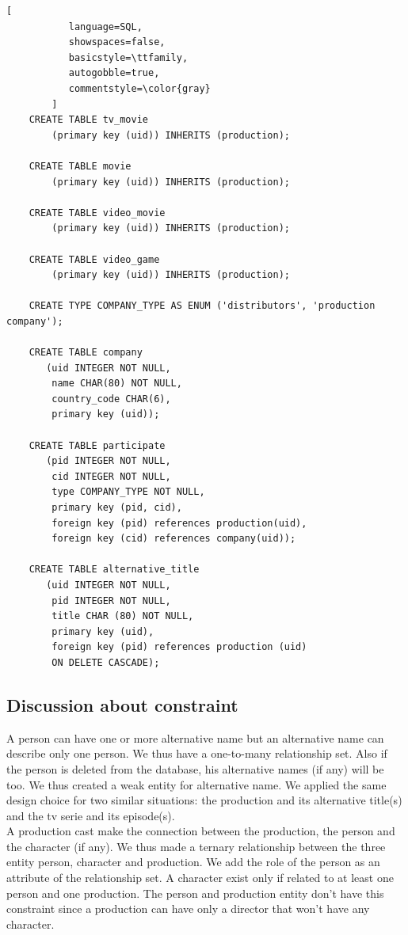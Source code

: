 \documentclass{article}
\begin{document}
\begin{lstlisting}[
           language=SQL,
           showspaces=false,
           basicstyle=\ttfamily,
           autogobble=true,
           commentstyle=\color{gray}
        ]
    CREATE TABLE tv_movie
        (primary key (uid)) INHERITS (production);
    
    CREATE TABLE movie
        (primary key (uid)) INHERITS (production);
    
    CREATE TABLE video_movie
        (primary key (uid)) INHERITS (production);
    
    CREATE TABLE video_game
        (primary key (uid)) INHERITS (production);
    
    CREATE TYPE COMPANY_TYPE AS ENUM ('distributors', 'production company');
    
    CREATE TABLE company
       (uid INTEGER NOT NULL,
        name CHAR(80) NOT NULL,
        country_code CHAR(6),
        primary key (uid));
    
    CREATE TABLE participate
       (pid INTEGER NOT NULL,
        cid INTEGER NOT NULL,
        type COMPANY_TYPE NOT NULL,
        primary key (pid, cid),
        foreign key (pid) references production(uid),
        foreign key (cid) references company(uid));
    
    CREATE TABLE alternative_title
       (uid INTEGER NOT NULL,
        pid INTEGER NOT NULL,
        title CHAR (80) NOT NULL,
        primary key (uid),
        foreign key (pid) references production (uid)
        ON DELETE CASCADE);
    \end{lstlisting}

\pagebreak
\subsection{Discussion about constraint}
    A person can have one or more alternative name but an alternative name can describe only one person. We thus have a one-to-many relationship set. Also if the person is deleted from the database, his alternative names (if any) will be too. We thus created a weak entity for alternative name.
    We applied the same design choice for two similar situations: the production and its alternative title(s) and the tv serie and its episode(s). \\
    
    A production cast make the connection between the production, the person and the character (if any). We thus made a ternary relationship between the three entity person, character and production. We add the role of the person as an attribute of the relationship set. A character exist only if related to at least one person and one production. The person and production entity don't have this constraint since a production can have only a director that won't have any character.  \\
    
\end{document}
